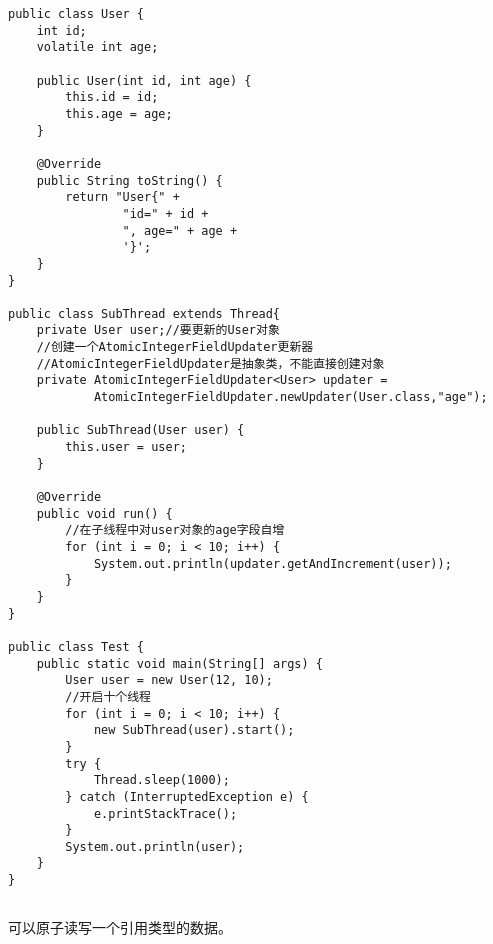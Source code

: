 \documentclass[a4paper]{report}
\begin{document}
\begin{Verbatim}[frame=single,numbersep=5pt,xleftmargin=1.5em,xrightmargin=1.5em]
public class User {
    int id;
    volatile int age;

    public User(int id, int age) {
        this.id = id;
        this.age = age;
    }

    @Override
    public String toString() {
        return "User{" +
                "id=" + id +
                ", age=" + age +
                '}';
    }
}

public class SubThread extends Thread{
    private User user;//要更新的User对象
    //创建一个AtomicIntegerFieldUpdater更新器
    //AtomicIntegerFieldUpdater是抽象类，不能直接创建对象
    private AtomicIntegerFieldUpdater<User> updater =
            AtomicIntegerFieldUpdater.newUpdater(User.class,"age");

    public SubThread(User user) {
        this.user = user;
    }

    @Override
    public void run() {
        //在子线程中对user对象的age字段自增
        for (int i = 0; i < 10; i++) {
            System.out.println(updater.getAndIncrement(user));
        }
    }
}

public class Test {
    public static void main(String[] args) {
        User user = new User(12, 10);
        //开启十个线程
        for (int i = 0; i < 10; i++) {
            new SubThread(user).start();
        }
        try {
            Thread.sleep(1000);
        } catch (InterruptedException e) {
            e.printStackTrace();
        }
        System.out.println(user);
    }
}
\end{Verbatim}
\subsection{}
可以原子读写一个引用类型的数据。
\end{document}
